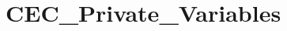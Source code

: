 \hypertarget{group___c_e_c___private___variables}{\section{C\-E\-C\-\_\-\-Private\-\_\-\-Variables}
\label{group___c_e_c___private___variables}
}
